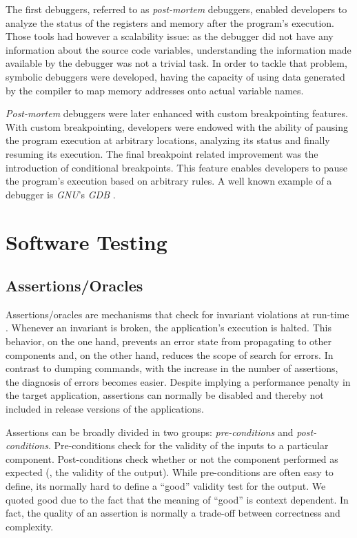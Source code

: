 The first debuggers, referred to as \textit{post-mortem} debuggers,
enabled developers to analyze the status of the registers and memory
after the program's execution.
%
Those tools had however a scalability issue: as the debugger did not
have any information about the source code variables, understanding
the information made available by the debugger was not a trivial task.
%
In order to tackle that problem, symbolic debuggers were developed,
having the capacity of using data generated by the compiler to map
memory addresses onto actual variable names.

\textit{Post-mortem} debuggers were later enhanced with custom
breakpointing features.
%
With custom breakpointing, developers were endowed with the ability of
pausing the program execution at arbitrary locations, analyzing its
status and finally resuming its execution.
%
The final breakpoint related improvement was the introduction of
conditional breakpoints.
%
This feature enables developers to pause the program's execution based
on arbitrary rules.
%
A well known example of a debugger is \emph{GNU}'s \emph{GDB}
\citep{Stallman02}.


\section{Software Testing}

\subsection*{Assertions/Oracles}
Assertions/oracles are mechanisms that check for invariant violations
at run-time \citep{Rosenblum95}.
%
Whenever an invariant is broken, the application's execution is
halted.
%
This behavior, on the one hand, prevents an error state from
propagating to other components and, on the other hand, reduces the
scope of search for errors.
%
In contrast to dumping commands, with the increase in the number of
assertions, the diagnosis of errors becomes easier.
%
Despite implying a performance penalty in the target application,
assertions can normally be disabled and thereby not included in
release versions of the applications.

Assertions can be broadly divided in two groups: \emph{pre-conditions}
and \emph{post-conditions}.
%
Pre-conditions check for the validity of the inputs to a particular
component.
%
Post-conditions check whether or not the component
performed as expected (\ie, the validity of the output).
%
While pre-conditions are often easy to define, its normally hard to
define a ``good'' validity test for the output.
%
We quoted good due to the fact that the meaning of ``good'' is context
dependent.
%
In fact, the quality of an assertion is normally a trade-off between
correctness and complexity.

